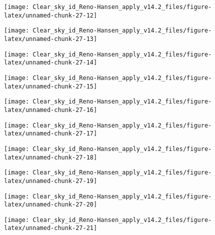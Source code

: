 \documentclass[
  10pt,
  a4paper,oneside]{article}
\begin{document}
\begin{center}\texttt{[image: Clear\_sky\_id\_Reno-Hansen\_apply\_v14.2\_files/figure-latex/unnamed-chunk-27-12]} \end{center}

\begin{center}\texttt{[image: Clear\_sky\_id\_Reno-Hansen\_apply\_v14.2\_files/figure-latex/unnamed-chunk-27-13]} \end{center}

\begin{center}\texttt{[image: Clear\_sky\_id\_Reno-Hansen\_apply\_v14.2\_files/figure-latex/unnamed-chunk-27-14]} \end{center}

\begin{center}\texttt{[image: Clear\_sky\_id\_Reno-Hansen\_apply\_v14.2\_files/figure-latex/unnamed-chunk-27-15]} \end{center}

\begin{center}\texttt{[image: Clear\_sky\_id\_Reno-Hansen\_apply\_v14.2\_files/figure-latex/unnamed-chunk-27-16]} \end{center}

\begin{center}\texttt{[image: Clear\_sky\_id\_Reno-Hansen\_apply\_v14.2\_files/figure-latex/unnamed-chunk-27-17]} \end{center}

\begin{center}\texttt{[image: Clear\_sky\_id\_Reno-Hansen\_apply\_v14.2\_files/figure-latex/unnamed-chunk-27-18]} \end{center}

\begin{center}\texttt{[image: Clear\_sky\_id\_Reno-Hansen\_apply\_v14.2\_files/figure-latex/unnamed-chunk-27-19]} \end{center}

\begin{center}\texttt{[image: Clear\_sky\_id\_Reno-Hansen\_apply\_v14.2\_files/figure-latex/unnamed-chunk-27-20]} \end{center}

\begin{center}\texttt{[image: Clear\_sky\_id\_Reno-Hansen\_apply\_v14.2\_files/figure-latex/unnamed-chunk-27-21]} \end{center}
\end{document}
